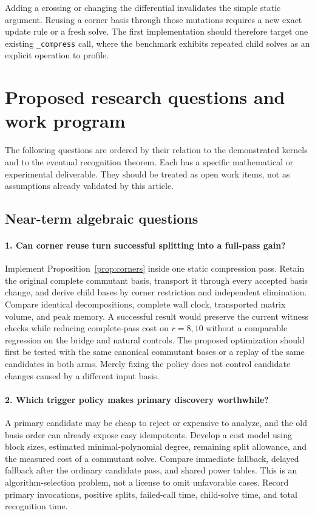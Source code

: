 \documentclass[11pt,a4paper]{article}
\theoremstyle{definition}\newtheorem{definition}[theorem]{Definition}
\theoremstyle{remark}\newtheorem{remark}[theorem]{Remark}
\newcommand{\code}[1]{\nolinkurl{#1}}
\begin{document}
Adding a crossing or changing the differential invalidates the simple
static argument. Reusing a corner basis through those mutations requires a
new exact update rule or a fresh solve. The first implementation should
therefore target one existing \code{_compress} call, where the benchmark
exhibits repeated child solves as an explicit operation to profile.

\section{Proposed research questions and work program}
\label{sec:research}

The following questions are ordered by their relation to the demonstrated
kernels and to the eventual recognition theorem. Each has a specific
mathematical or experimental deliverable. They should be treated as open
work items, not as assumptions already validated by this article.

\subsection{Near-term algebraic questions}

\paragraph{1. Can corner reuse turn successful splitting into a full-pass gain?}
Implement Proposition~\ref{prop:corners} inside one static compression pass.
Retain the original complete commutant basis, transport it through every
accepted basis change, and derive child bases by corner restriction and
independent elimination. Compare identical decompositions, complete wall
clock, transported matrix volume, and peak memory. A successful result
would preserve the current witness checks while reducing complete-pass
cost on $r=8,10$ without a comparable regression on the bridge and natural
controls. The proposed optimization should first be tested with the same
canonical commutant bases or a replay of the same candidates in both arms.
Merely fixing the policy does not control candidate changes caused by a
different input basis.

\paragraph{2. Which trigger policy makes primary discovery worthwhile?}
A primary candidate may be cheap to reject or expensive to analyze, and
the old basis order can already expose easy idempotents. Develop a cost
model using block sizes, estimated minimal-polynomial degree, remaining
split allowance, and the measured cost of a commutant solve. Compare
immediate fallback, delayed fallback after the ordinary candidate pass,
and shared power tables. This is an algorithm-selection problem, not a
license to omit unfavorable cases. Record primary invocations, positive
splits, failed-call time, child-solve time, and total recognition time.
\end{document}
